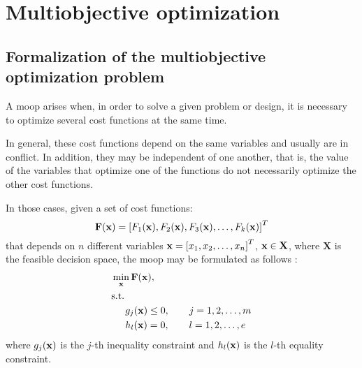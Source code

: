 \chapter{Multiobjective optimization}
\label{chap:Multi-objective}
{} 

\section{Formalization of the multiobjective optimization problem}
\label{sec:MOOPForm}
%
A \gls{moop} arises when, in order to solve a given problem or design, it is necessary to optimize several cost functions at the same time. 

In general, these cost functions depend on the same variables and usually are in conflict.  In addition, they may be independent of one another, that is, the value of the variables that optimize one of the functions do not necessarily optimize the other cost functions.

In those cases, given a set of cost functions:
\begin{equation}
\mathbf{F}(\mathbf{x})=\left[F_1(\mathbf{x}), F_2(\mathbf{x}), F_3(\mathbf{x}), \ldots, F_k(\mathbf{x})\right]^T
\label{eq:functions}
\end{equation}
%
that depends on $n$ different variables $\mathbf{x}=\left[x_1, x_2, \ldots, x_n \right]^T$, $\mathbf{x} \in \mathbf{X}$, where $\mathbf{X}$ is the feasible decision space, the \gls{moop} may be formulated as follows \citep{Marler2004}:%
%
\begin{subequations}%
	\begin{align}%
	&\min_\xv \mathbf{F}(\xv), \label{eq:Min01}\\ %
	&\text{s.t.}\nonumber\\%
	& \hspace{5mm} g_j(\xv) \leq 0, \qquad j=1,2,\ldots,m  \label{eq:Min02}\\ %
	& \hspace{5mm} h_l(\xv) = 0, \qquad l=1,2,\ldots,e  \label{eq:Min03}%
	\end{align}%
	\label{eq:OptProb}%
\end{subequations}%
%
where $g_j(\mathbf{x})$ is the $j$-th inequality constraint and $h_l(\mathbf{x})$ is the $l$-th equality constraint. 
%
